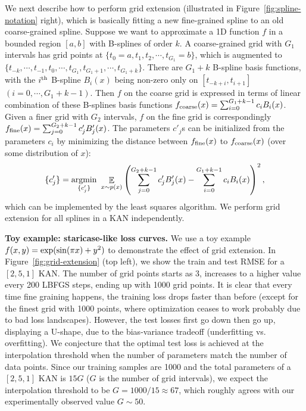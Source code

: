 \documentclass{article}
\numberwithin{equation}{section}
\numberwithin{figure}{section}
\begin{document}
We next describe how to perform grid extension (illustrated in Figure~\ref{fig:spline-notation} right), which is basically fitting a new fine-grained spline to an old coarse-grained spline. Suppose we want to approximate a 1D function $f$ in a bounded region $[a, b]$ with B-splines of order $k$. A coarse-grained grid with $G_1$ intervals has grid points at $\{t_0=a,t_1,t_2,\cdots, t_{G_1}=b\}$, which is augmented to $\{t_{-k},\cdots,t_{-1},t_0,\cdots, t_{G_1},t_{G_1+1},\cdots,t_{G_1+k}\}$. There are $G_1+k$ B-spline basis functions, with the $i^{\rm th}$ B-spline $B_i(x)$ being non-zero only on $[t_{-k+i},t_{i+1}]$ $(i=0,\cdots,G_1+k-1)$. Then $f$ on the coarse grid is expressed in terms of linear combination of these B-splines basis functions $f_{\rm coarse}(x)=\sum_{i=0}^{G_1+k-1} c_i B_i(x)$. Given a finer grid with $G_2$ intervals, $f$ on the fine grid is correspondingly $f_{\rm fine}(x)=\sum_{j=0}^{G_2+k-1}c_j'B_j'(x)$. The parameters $c'_j$s can be initialized from the parameters $c_i$ by minimizing the distance between $f_{\rm fine}(x)$ to $f_{\rm coarse}(x)$ (over some distribution of $x$):
\begin{equation}
    \{c_j'\} = \underset{\{c_j'\}}{\rm argmin}\ \mathop{\mathbb{E}}_{x\sim p(x)}\left(\sum_{j=0}^{G_2+k-1}c_j'B_j'(x)-\sum_{i=0}^{G_1+k-1} c_i B_i(x)\right)^2,
\end{equation}
which can be implemented by the least squares algorithm. We perform grid extension for all splines in a KAN independently.

{\bf Toy example: staricase-like loss curves.} We use a toy example $f(x,y)={\rm exp}({\rm sin}(\pi x)+y^2)$ to demonstrate the effect of grid extension. In Figure~\ref{fig:grid-extension} (top left), we show the train and test RMSE for a $[2,5,1]$ KAN. The number of grid points starts as 3, increases to a higher value every 200 LBFGS steps, ending up with 1000 grid points. It is clear that every time fine graining happens, the training loss drops faster than before (except for the finest grid with 1000 points, where optimization ceases to work probably due to bad loss landscapes). However, the test losses first go down then go up, displaying a U-shape, due to the bias-variance tradeoff (underfitting vs. overfitting). We conjecture that the optimal test loss is achieved at the interpolation threshold when the number of parameters match the number of data points. Since our training samples are 1000 and the total parameters of a $[2,5,1]$ KAN is $15G$ ($G$ is the number of grid intervals), we expect the interpolation threshold to be $G=1000/15\approx 67$, which roughly agrees with our experimentally observed value $G\sim 50$.
\end{document}
